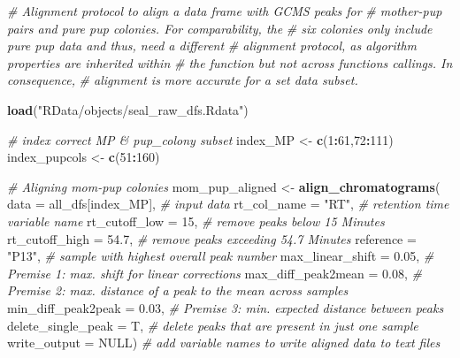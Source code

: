 \documentclass[]{article}
\newenvironment{Shaded}{\begin{snugshade}}{\end{snugshade}}
\newcommand{\KeywordTok}[1]{\textcolor[rgb]{0.13,0.29,0.53}{\textbf{#1}}}
\newcommand{\DataTypeTok}[1]{\textcolor[rgb]{0.13,0.29,0.53}{#1}}
\newcommand{\DecValTok}[1]{\textcolor[rgb]{0.00,0.00,0.81}{#1}}
\newcommand{\FloatTok}[1]{\textcolor[rgb]{0.00,0.00,0.81}{#1}}
\newcommand{\StringTok}[1]{\textcolor[rgb]{0.31,0.60,0.02}{#1}}
\newcommand{\CommentTok}[1]{\textcolor[rgb]{0.56,0.35,0.01}{\textit{#1}}}
\newcommand{\OtherTok}[1]{\textcolor[rgb]{0.56,0.35,0.01}{#1}}
\newcommand{\OperatorTok}[1]{\textcolor[rgb]{0.81,0.36,0.00}{\textbf{#1}}}
\newcommand{\NormalTok}[1]{#1}
\begin{document}
\begin{Shaded}
\begin{Highlighting}[]
\CommentTok{# Alignment protocol to align a data frame with GCMS peaks for }
\CommentTok{# mother-pup pairs and pure pup colonies. For comparability, the }
\CommentTok{# six colonies only include pure pup data and thus, need a different }
\CommentTok{# alignment protocol, as algorithm properties are inherited within }
\CommentTok{# the function but not across functions callings. In consequence, }
\CommentTok{# alignment is more accurate for a set data subset.}


\KeywordTok{load}\NormalTok{(}\StringTok{"RData/objects/seal_raw_dfs.Rdata"}\NormalTok{)}

\CommentTok{# index correct MP & pup_colony subset}
\NormalTok{index_MP <-}\StringTok{ }\KeywordTok{c}\NormalTok{(}\DecValTok{1}\OperatorTok{:}\DecValTok{61}\NormalTok{,}\DecValTok{72}\OperatorTok{:}\DecValTok{111}\NormalTok{)}
\NormalTok{index_pupcols <-}\StringTok{ }\KeywordTok{c}\NormalTok{(}\DecValTok{51}\OperatorTok{:}\DecValTok{160}\NormalTok{)}

\CommentTok{# Aligning mom-pup colonies}
\NormalTok{mom_pup_aligned <-}\StringTok{ }\KeywordTok{align_chromatograms}\NormalTok{(}
  \DataTypeTok{data =}\NormalTok{ all_dfs[index_MP], }\CommentTok{# input data}
  \DataTypeTok{rt_col_name =} \StringTok{"RT"}\NormalTok{, }\CommentTok{# retention time variable name }
  \DataTypeTok{rt_cutoff_low =} \DecValTok{15}\NormalTok{, }\CommentTok{# remove peaks below 15 Minutes}
  \DataTypeTok{rt_cutoff_high =} \FloatTok{54.7}\NormalTok{, }\CommentTok{# remove peaks exceeding 54.7 Minutes}
  \DataTypeTok{reference =} \StringTok{"P13"}\NormalTok{, }\CommentTok{# sample with highest overall peak number}
  \DataTypeTok{max_linear_shift =} \FloatTok{0.05}\NormalTok{, }\CommentTok{# Premise 1: max. shift for linear corrections}
  \DataTypeTok{max_diff_peak2mean =} \FloatTok{0.08}\NormalTok{, }\CommentTok{# Premise 2: max. distance of a peak to the mean across samples}
  \DataTypeTok{min_diff_peak2peak =} \FloatTok{0.03}\NormalTok{, }\CommentTok{# Premise 3: min. expected distance between peaks }
  \DataTypeTok{delete_single_peak =}\NormalTok{ T, }\CommentTok{# delete peaks that are present in just one sample }
  \DataTypeTok{write_output =} \OtherTok{NULL}\NormalTok{) }\CommentTok{# add variable names to write aligned data to text files}


\end{Highlighting}
\end{Shaded}
\end{document}
